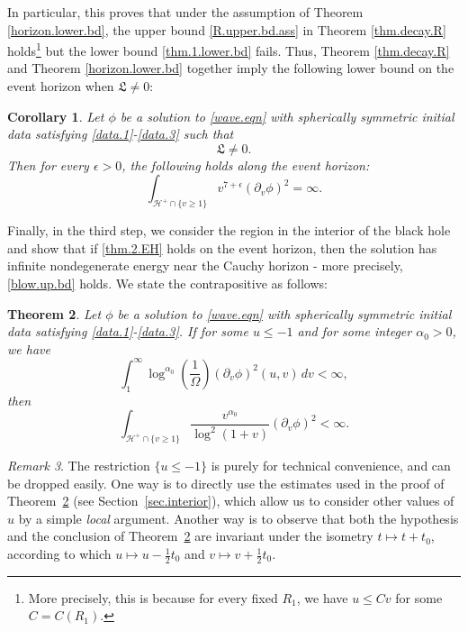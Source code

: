 \documentclass[12 pt, reqno]{amsart}
\newtheorem{theorem}{Theorem}[section]
\newtheorem{corollary}[theorem]{Corollary}
\theoremstyle{definition}
\theoremstyle{remark}
\newtheorem{remark}[theorem]{Remark}
\numberwithin{equation}{section}
\newcommand{\set}[1]{\{#1\}}
\newcommand{\ep}{\epsilon}
\newcommand{\rd}{\partial}
\newcommand{\0}{\emptyset}
\newcommand{\f}{\frac}
\begin{document}
In particular, this proves that under the assumption of Theorem \ref{horizon.lower.bd}, the upper bound \eqref{R.upper.bd.ass} in Theorem \ref{thm.decay.R} holds\footnote{More precisely, this is because for every fixed $R_1$, we have $u\leq C v$ for some $C=C(R_1)$.} but the lower bound \eqref{thm.1.lower.bd} fails. Thus, Theorem \ref{thm.decay.R} and Theorem \ref{horizon.lower.bd} together imply the following lower bound on the event horizon when $\mathfrak L\neq 0$:
\begin{corollary}\label{cor.horizon.lower.bd}
Let $\phi$ be a solution to \eqref{wave.eqn} with spherically symmetric initial data satisfying \eqref{data.1}-\eqref{data.3} such that
$$\mathfrak L\neq 0.$$
Then for every $\ep>0$, the following holds along the event horizon:
\begin{equation}\label{thm.2.EH}
\int_{\mathcal H^+\cap \{v\geq 1\}} v^{7+\ep}(\rd_v\phi)^2 =\infty.
\end{equation}
\end{corollary}
Finally, in the third step, we consider the region in the interior of the black hole and show that if \eqref{thm.2.EH} holds on the event horizon, then the solution has infinite nondegenerate energy near the Cauchy horizon - more precisely, \eqref{blow.up.bd} holds. We state the contrapositive as follows:
\begin{theorem}\label{final.blow.up.step}
Let $\phi$ be a solution to \eqref{wave.eqn} with spherically symmetric initial data satisfying \eqref{data.1}-\eqref{data.3}. If for some $u\leq -1$ and for some integer $\alpha_0>0$, we have
$$\int_{1}^\infty \log^{\alpha_0}(\f 1{\Omega}) (\rd_v\phi)^2(u,v)\, dv<\infty,$$
then 
$$\int_{\mathcal H^+\cap \{v\geq 1\}} \f{v^{\alpha_0}}{\log^2(1+v)}(\rd_v\phi)^2 <\infty.$$
\end{theorem}


\begin{remark} \label{rem:wholeCH}
The restriction $\set{u \leq -1}$ is purely for technical convenience, and can be dropped easily. One way is to directly use the estimates used in the proof of Theorem~\ref{final.blow.up.step} (see Section~\ref{sec.interior}), which allow us to consider other values of $u$ by a simple \emph{local} argument. Another way is to observe that both the hypothesis and the conclusion of Theorem~\ref{final.blow.up.step} are invariant under the isometry $t \mapsto t + t_{0}$, according to which $u \mapsto u - \frac{1}{2} t_{0}$ and $v \mapsto v + \frac{1}{2} t_{0}$.
\end{remark}
\end{document}
